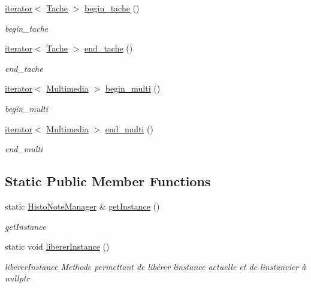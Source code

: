 \begin{DoxyCompactItemize}
\hyperlink{class_histo_note_manager_1_1iterator}{iterator}$<$ \hyperlink{class_tache}{Tache} $>$ \hyperlink{class_histo_note_manager_a55b63250519f28014747eab460fc6e6c}{begin\+\_\+tache} ()
\begin{DoxyCompactList}\small\item\em begin\+\_\+tache \end{DoxyCompactList}\item 
\hyperlink{class_histo_note_manager_1_1iterator}{iterator}$<$ \hyperlink{class_tache}{Tache} $>$ \hyperlink{class_histo_note_manager_a2c0ed9638820a52fcdd60d10c0257607}{end\+\_\+tache} ()
\begin{DoxyCompactList}\small\item\em end\+\_\+tache \end{DoxyCompactList}\item 
\hyperlink{class_histo_note_manager_1_1iterator}{iterator}$<$ \hyperlink{class_multimedia}{Multimedia} $>$ \hyperlink{class_histo_note_manager_a61004bdec10b21d4adc2e288d278cf95}{begin\+\_\+multi} ()
\begin{DoxyCompactList}\small\item\em begin\+\_\+multi \end{DoxyCompactList}\item 
\hyperlink{class_histo_note_manager_1_1iterator}{iterator}$<$ \hyperlink{class_multimedia}{Multimedia} $>$ \hyperlink{class_histo_note_manager_a06d66890cadc6e9943ef3b073b5d6203}{end\+\_\+multi} ()
\begin{DoxyCompactList}\small\item\em end\+\_\+multi \end{DoxyCompactList}\end{DoxyCompactItemize}
\subsection*{Static Public Member Functions}
\begin{DoxyCompactItemize}
\item 
static \hyperlink{class_histo_note_manager}{Histo\+Note\+Manager} \& \hyperlink{class_histo_note_manager_a9174873cef82d50e2b2479de6350d945}{get\+Instance} ()
\begin{DoxyCompactList}\small\item\em get\+Instance \end{DoxyCompactList}\item 
\mbox{\label{class_histo_note_manager_a2de677e166803863888db8883993d25e}} 
static void \hyperlink{class_histo_note_manager_a2de677e166803863888db8883993d25e}{liberer\+Instance} ()
\begin{DoxyCompactList}\small\item\em liberer\+Instance Methode permettant de libérer l\textquotesingle{}instance actuelle et de l\textquotesingle{}instancier à nullptr \end{DoxyCompactList}\end{DoxyCompactItemize}


